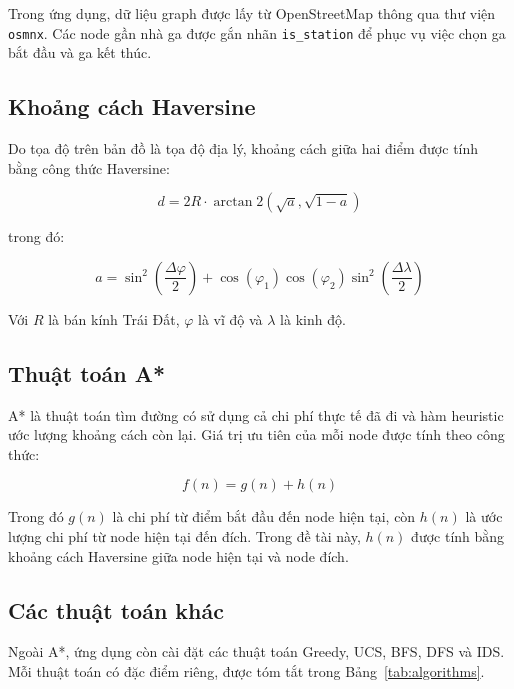 \documentclass[12pt,a4paper]{article}
\begin{document}
Trong ứng dụng, dữ liệu graph được lấy từ OpenStreetMap thông qua thư viện \texttt{osmnx}. Các node gần nhà ga được gắn nhãn \texttt{is\_station} để phục vụ việc chọn ga bắt đầu và ga kết thúc.

\subsection{Khoảng cách Haversine}

Do tọa độ trên bản đồ là tọa độ địa lý, khoảng cách giữa hai điểm được tính bằng công thức Haversine:

\[
d = 2R \cdot \arctan2(\sqrt{a}, \sqrt{1-a})
\]

trong đó:

\[
a = \sin^2\left(\frac{\Delta \varphi}{2}\right)
    + \cos(\varphi_1)\cos(\varphi_2)\sin^2\left(\frac{\Delta \lambda}{2}\right)
\]

Với $R$ là bán kính Trái Đất, $\varphi$ là vĩ độ và $\lambda$ là kinh độ.

\subsection{Thuật toán A*}

A* là thuật toán tìm đường có sử dụng cả chi phí thực tế đã đi và hàm heuristic ước lượng khoảng cách còn lại. Giá trị ưu tiên của mỗi node được tính theo công thức:

\[
f(n) = g(n) + h(n)
\]

Trong đó $g(n)$ là chi phí từ điểm bắt đầu đến node hiện tại, còn $h(n)$ là ước lượng chi phí từ node hiện tại đến đích. Trong đề tài này, $h(n)$ được tính bằng khoảng cách Haversine giữa node hiện tại và node đích.

\subsection{Các thuật toán khác}

Ngoài A*, ứng dụng còn cài đặt các thuật toán Greedy, UCS, BFS, DFS và IDS. Mỗi thuật toán có đặc điểm riêng, được tóm tắt trong Bảng~\ref{tab:algorithms}.
\end{document}
